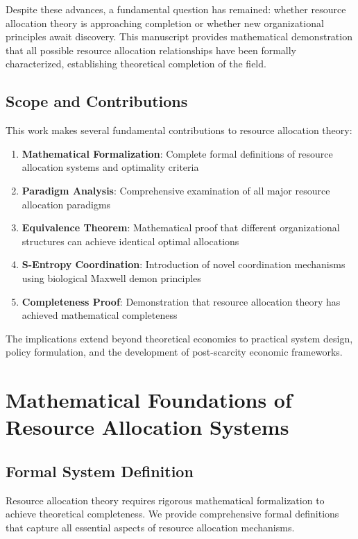 \documentclass[12pt,a4paper]{article}
\begin{document}
Despite these advances, a fundamental question has remained: whether resource allocation theory is approaching completion or whether new organizational principles await discovery. This manuscript provides mathematical demonstration that all possible resource allocation relationships have been formally characterized, establishing theoretical completion of the field.

\subsection{Scope and Contributions}

This work makes several fundamental contributions to resource allocation theory:

\begin{enumerate}
\item \textbf{Mathematical Formalization}: Complete formal definitions of resource allocation systems and optimality criteria
\item \textbf{Paradigm Analysis}: Comprehensive examination of all major resource allocation paradigms
\item \textbf{Equivalence Theorem}: Mathematical proof that different organizational structures can achieve identical optimal allocations
\item \textbf{S-Entropy Coordination}: Introduction of novel coordination mechanisms using biological Maxwell demon principles
\item \textbf{Completeness Proof}: Demonstration that resource allocation theory has achieved mathematical completeness
\end{enumerate}

The implications extend beyond theoretical economics to practical system design, policy formulation, and the development of post-scarcity economic frameworks.

\section{Mathematical Foundations of Resource Allocation Systems}

\subsection{Formal System Definition}

Resource allocation theory requires rigorous mathematical formalization to achieve theoretical completeness. We provide comprehensive formal definitions that capture all essential aspects of resource allocation mechanisms.
\end{document}
